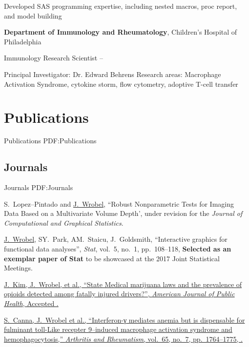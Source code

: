 \documentclass[a4paper,10pt,oneside]{article}
\begin{document}
\begin{body}
\begin{detail}
\BulletItem
Developed SAS programming expertise, including nested macros, proc report, and model building
\end{detail}
\EntryGap
\textbf{Department of Immunology and Rheumatology},
Children's Hospital of Philadelphia
\par

Immunology Research Scientist
\hfill
{} --
\begin{detail}
\BulletItem
Principal Investigator:
Dr. Edward Behrens
\BulletItem
Research areas:
Macrophage Activation Syndrome, cytokine storm, flow cytometry, adoptive T-cell transfer
\end{detail}



\section
{Publications}
{Publications}
{PDF:Publications}

\subsection
{Journals}
{Journals}
{PDF:Journals}

\EntryGap
{}
S.~Lopez--Pintado and \underline{J.~Wrobel},
``Robust Nonparametric Tests for Imaging Data Based on a Multivariate Volume Depth',
under revision for the \textit{Journal of Computational and Graphical Statistics}.


\EntryGap
{}
{\underline{J.~Wrobel}, SY.~Park, AM.~Staicu, J.~Goldsmith,
``Interactive graphics for functional data analyses'',
\textit{Stat},
vol.~5,
no.~1,
pp.~108--118,
\textbf{Selected as an exemplar paper of Stat} to be showcased at the 2017 Joint Statistical Meetings.}
   
\EntryGap
{}
\href{http://www.example.com/my-paper-doi-4}
{J.~Kim, \underline{J.~Wrobel}, et al.,
``State Medical marijuana laws and the prevalence of opioids detected among fatally injured drivers?'',
\textit{American Journal of Public Health},
Accepted .}

\EntryGap
{}
\href{http://www.example.com/my-paper-doi-3}
{S.~Canna, \underline{J.~Wrobel} et al.,
``Interferon-γ mediates anemia but is dispensable for fulminant toll-Like recepter 9–induced macrophage activation syndrome and hemophagocytosis,''
\textit{Arthritis and Rheumatism},
vol.~65,
no.~7,
pp.~1764--1775,
.}


\end{body}
\end{document}
